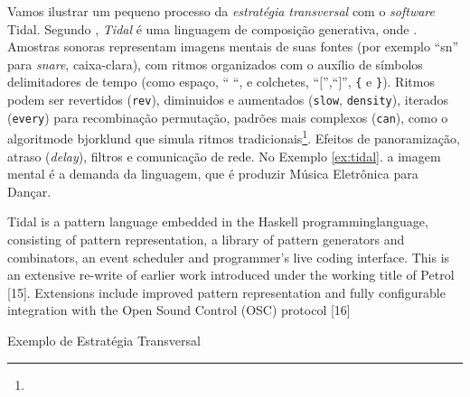 {Vamos ilustrar um pequeno processo da \emph{estratégia transversal} com o \emph{software} Tidal.
Segundo , \emph{Tidal} é uma linguagem de composição generativa, onde . Amostras sonoras representam imagens mentais de suas fontes (por exemplo ``sn'' para \emph{snare}, caixa-clara), com ritmos organizados com o auxílio de símbolos delimitadores de tempo (como espaço, `` ``, e colchetes, ``$[$'',``$]$'', \verb|{| e \verb|}|). Ritmos podem ser revertidos (\verb|rev|), diminuidos e aumentados (\verb|slow|, \verb|density|), iterados (\verb|every|) para recombinação permutação, padrões mais complexos (\verb|can|), como o algoritmode bjorklund que simula ritmos tradicionais\footnote{}. Efeitos de panoramização, atraso (\emph{delay}), filtros e comunicação de rede. No Exemplo \ref{ex:tidal}. a imagem mental é a demanda da linguagem, que é produzir Música Eletrônica para Dançar.

\begin{citacao}
{Tidal is a pattern language embedded in the Haskell programminglanguage, consisting of pattern representation, a library of pattern generators and combinators, an event scheduler and programmer’s live coding interface. This is an extensive re-write of earlier work introduced under the working title of Petrol [15]. Extensions include improved pattern representation and fully configurable integration with the Open Sound Control (OSC) protocol [16]
}
\end{citacao}

\begin{example}{Exemplo de Estratégia Transversal}\label{ex:tidal}


\end{example}}
